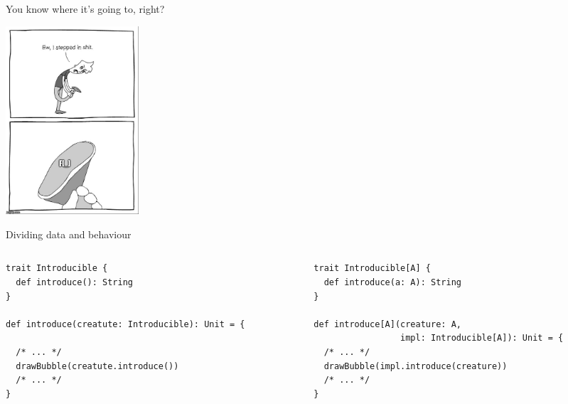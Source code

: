 \documentclass[presentation,aspectratio=169,smaller]{beamer}
\begin{document}
\begin{frame}[label={sec:org86ba1f5}]{You know where it’s going to, right?}
\pause

\begin{center}
\includegraphics[height=7cm]{images/f_.jpg}
\end{center}
\end{frame}

\begin{frame}[label={sec:orgcb899e9},fragile]{Dividing data and behaviour}
 \begin{columns}
\begin{column}[t]{0.5\columnwidth}
\begin{verbatim}
trait Introducible {
  def introduce(): String
}

def introduce(creatute: Introducible): Unit = {

  /* ... */
  drawBubble(creatute.introduce())
  /* ... */
}
\end{verbatim}

\pause
\end{column}

\begin{column}[t]{0.5\columnwidth}
\begin{verbatim}
trait Introducible[A] {
  def introduce(a: A): String
}

def introduce[A](creature: A,
                 impl: Introducible[A]): Unit = {
  /* ... */
  drawBubble(impl.introduce(creature))
  /* ... */
}
\end{verbatim}
\end{column}
\end{columns}
\end{frame}
\end{document}
